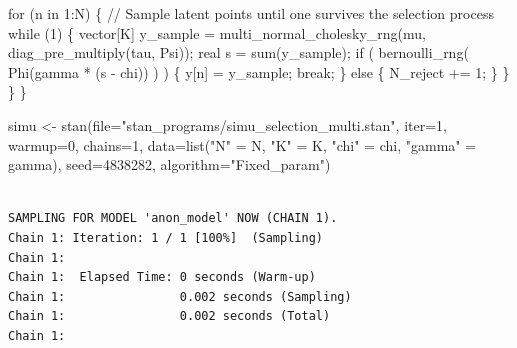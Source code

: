 \documentclass[
  letterpaper,
  DIV=11,
  numbers=noendperiod]{scrartcl}
\newenvironment{Shaded}{\begin{snugshade}}{\end{snugshade}}
\newcommand{\AttributeTok}[1]{\textcolor[rgb]{0.40,0.45,0.13}{#1}}
\newcommand{\CommentTok}[1]{\textcolor[rgb]{0.37,0.37,0.37}{#1}}
\newcommand{\ControlFlowTok}[1]{\textcolor[rgb]{0.00,0.23,0.31}{#1}}
\newcommand{\DataTypeTok}[1]{\textcolor[rgb]{0.68,0.00,0.00}{#1}}
\newcommand{\DecValTok}[1]{\textcolor[rgb]{0.68,0.00,0.00}{#1}}
\newcommand{\FunctionTok}[1]{\textcolor[rgb]{0.28,0.35,0.67}{#1}}
\newcommand{\NormalTok}[1]{\textcolor[rgb]{0.00,0.23,0.31}{#1}}
\newcommand{\OtherTok}[1]{\textcolor[rgb]{0.00,0.23,0.31}{#1}}
\newcommand{\StringTok}[1]{\textcolor[rgb]{0.13,0.47,0.30}{#1}}
\begin{document}
\begin{codelisting}
\begin{Shaded}
\begin{Highlighting}[]
  \ControlFlowTok{for}\NormalTok{ (n }\ControlFlowTok{in} \DecValTok{1}\NormalTok{:N) \{}
    \CommentTok{// Sample latent points until one survives the selection process}
    \ControlFlowTok{while}\NormalTok{ (}\DecValTok{1}\NormalTok{) \{}
      \DataTypeTok{vector}\NormalTok{[K] y\_sample }
\NormalTok{        = multi\_normal\_cholesky\_rng(mu, diag\_pre\_multiply(tau, Psi));}
      \DataTypeTok{real}\NormalTok{ s = sum(y\_sample);}
      \ControlFlowTok{if}\NormalTok{ ( bernoulli\_rng( Phi(gamma * (s {-} chi)) ) ) \{}
\NormalTok{        y[n] = y\_sample;}
        \ControlFlowTok{break}\NormalTok{;}
\NormalTok{      \} }\ControlFlowTok{else}\NormalTok{ \{}
\NormalTok{        N\_reject += }\DecValTok{1}\NormalTok{;}
\NormalTok{      \}}
\NormalTok{    \}}
\NormalTok{  \}}
\NormalTok{\}}
\end{Highlighting}
\end{Shaded}

\end{codelisting}

\begin{Shaded}
\begin{Highlighting}[]
\NormalTok{simu }\OtherTok{\textless{}{-}} \FunctionTok{stan}\NormalTok{(}\AttributeTok{file=}\StringTok{"stan\_programs/simu\_selection\_multi.stan"}\NormalTok{,}
             \AttributeTok{iter=}\DecValTok{1}\NormalTok{, }\AttributeTok{warmup=}\DecValTok{0}\NormalTok{, }\AttributeTok{chains=}\DecValTok{1}\NormalTok{,}
             \AttributeTok{data=}\FunctionTok{list}\NormalTok{(}\StringTok{"N"} \OtherTok{=}\NormalTok{ N, }\StringTok{"K"} \OtherTok{=}\NormalTok{ K, }\StringTok{"chi"} \OtherTok{=}\NormalTok{ chi, }\StringTok{"gamma"} \OtherTok{=}\NormalTok{ gamma),}
             \AttributeTok{seed=}\DecValTok{4838282}\NormalTok{, }\AttributeTok{algorithm=}\StringTok{"Fixed\_param"}\NormalTok{)}
\end{Highlighting}
\end{Shaded}

\begin{verbatim}

SAMPLING FOR MODEL 'anon_model' NOW (CHAIN 1).
Chain 1: Iteration: 1 / 1 [100%]  (Sampling)
Chain 1: 
Chain 1:  Elapsed Time: 0 seconds (Warm-up)
Chain 1:                0.002 seconds (Sampling)
Chain 1:                0.002 seconds (Total)
Chain 1: 
\end{verbatim}
\end{document}
